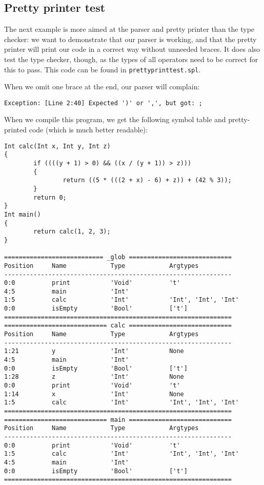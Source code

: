 \documentclass[a4paper]{article}
\begin{document}
\subsection{Pretty printer test}
The next example is more aimed at the parser and pretty printer than the type checker: we want to demonstrate that our parser is working, and that the pretty printer will print our code in a correct way without unneeded braces. It does also test the type checker, though, as the types of all operators need to be correct for this to pass. This code can be found in {\tt prettyprinttest.spl}.

When we omit one brace at the end, our parser will complain:
\begin{verbatim}
Exception: [Line 2:40] Expected ')' or ',', but got: ;
\end{verbatim}

When we compile this program, we get the following symbol table and pretty-printed code (which is much better readable):
\begin{verbatim}
Int calc(Int x, Int y, Int z)
{
        if ((((y + 1) > 0) && ((x / (y + 1)) > z)))
        {
                return ((5 * (((2 + x) - 6) + z)) + (42 % 3));
        }
        return 0;
}
Int main()
{
        return calc(1, 2, 3);
}

=========================== _glob ============================
Position     Name            Type            Argtypes            
--------------------------------------------------------------
0:0          print           'Void'          't'                 
4:5          main            'Int'                               
1:5          calc            'Int'           'Int', 'Int', 'Int' 
0:0          isEmpty         'Bool'          ['t']               
==============================================================
============================ calc ============================
Position     Name            Type            Argtypes            
--------------------------------------------------------------
1:21         y               'Int'           None                
4:5          main            'Int'                               
0:0          isEmpty         'Bool'          ['t']               
1:28         z               'Int'           None                
0:0          print           'Void'          't'                 
1:14         x               'Int'           None                
1:5          calc            'Int'           'Int', 'Int', 'Int' 
==============================================================
============================ main ============================
Position     Name            Type            Argtypes            
--------------------------------------------------------------
0:0          print           'Void'          't'                 
1:5          calc            'Int'           'Int', 'Int', 'Int' 
4:5          main            'Int'                               
0:0          isEmpty         'Bool'          ['t']               
==============================================================
\end{verbatim}
\end{document}
